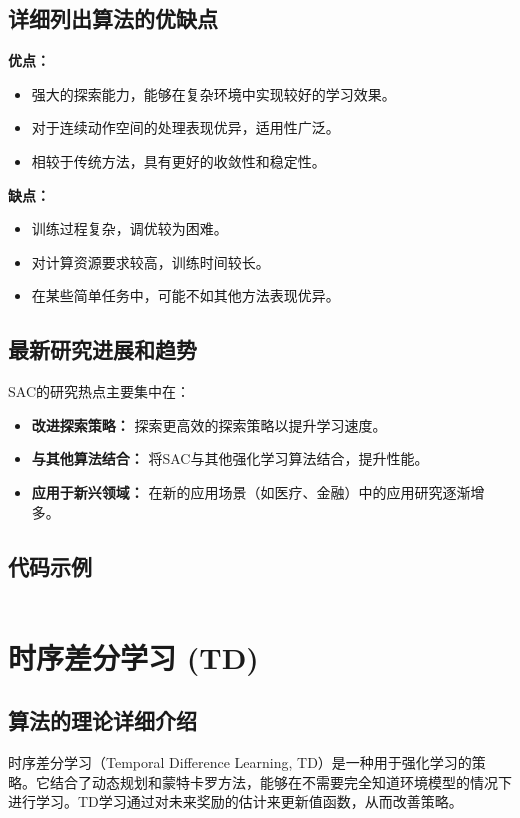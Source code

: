 \subsection*{详细列出算法的优缺点}
\textbf{优点：}
\begin{itemize}
    \item 强大的探索能力，能够在复杂环境中实现较好的学习效果。
    \item 对于连续动作空间的处理表现优异，适用性广泛。
    \item 相较于传统方法，具有更好的收敛性和稳定性。
\end{itemize}

\textbf{缺点：}
\begin{itemize}
    \item 训练过程复杂，调优较为困难。
    \item 对计算资源要求较高，训练时间较长。
    \item 在某些简单任务中，可能不如其他方法表现优异。
\end{itemize}

\subsection*{最新研究进展和趋势}
SAC的研究热点主要集中在：
\begin{itemize}
    \item \textbf{改进探索策略：} 探索更高效的探索策略以提升学习速度。
    \item \textbf{与其他算法结合：} 将SAC与其他强化学习算法结合，提升性能。
    \item \textbf{应用于新兴领域：} 在新的应用场景（如医疗、金融）中的应用研究逐渐增多。
\end{itemize}
\subsection*{代码示例}
\begin{lstlisting}

\end{lstlisting}


\section{时序差分学习 (TD)}
\subsection*{算法的理论详细介绍}
时序差分学习（Temporal Difference Learning, TD）是一种用于强化学习的策略。它结合了动态规划和蒙特卡罗方法，能够在不需要完全知道环境模型的情况下进行学习。TD学习通过对未来奖励的估计来更新值函数，从而改善策略。

